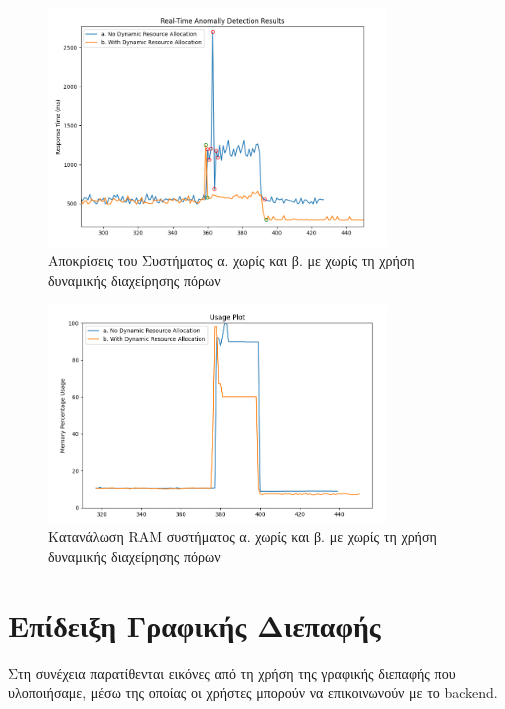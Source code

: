\begin{figure}[!ht]
	\centering
	\includegraphics[width=0.8\textwidth]{./images/chapter5/responses.png}
	\caption[Αποκρίσεις του Συστήματος α. χωρίς και β. με χωρίς τη χρήση δυναμικής διαχείρησης πόρων]{Αποκρίσεις του Συστήματος α. χωρίς και β. με χωρίς τη χρήση δυναμικής διαχείρησης πόρων}
	\label{fig:anomally-detection-responses}
\end{figure}

\begin{figure}[!ht]
	\centering
	\includegraphics[width=0.8\textwidth]{./images/chapter5/usages.png}
	\caption[Κατανάλωση RAM συστήματος α. χωρίς και β. με χωρίς τη χρήση δυναμικής διαχείρησης πόρων]{Κατανάλωση RAM συστήματος α. χωρίς και β. με χωρίς τη χρήση δυναμικής διαχείρησης πόρων}
	\label{fig:anomally-detection-usages}
\end{figure}

\section{Επίδειξη Γραφικής Διεπαφής}
\label{section:webapp_showcase}

Στη συνέχεια παρατίθενται εικόνες από τη χρήση της γραφικής διεπαφής που υλοποιήσαμε, μέσω της οποίας
οι χρήστες μπορούν να επικοινωνούν με το backend.


